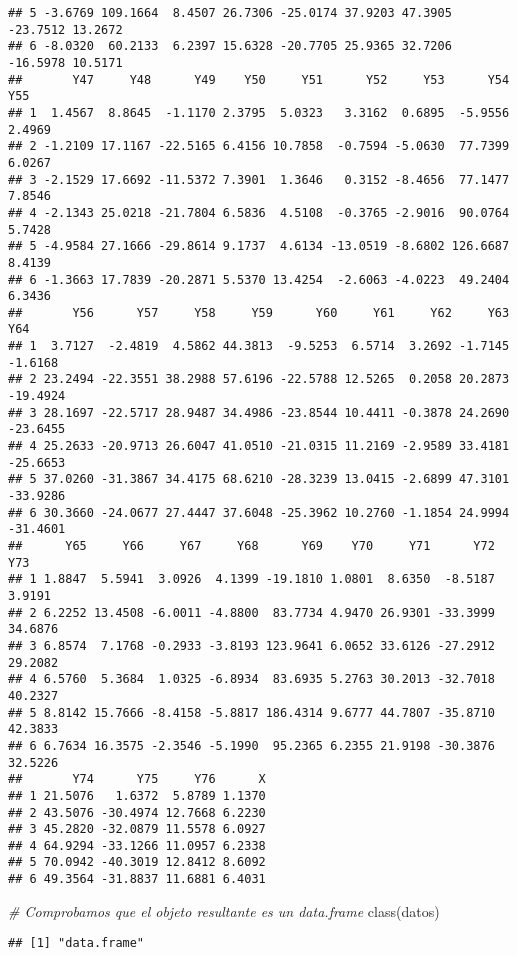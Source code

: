 \documentclass[
]{article}
\newenvironment{Shaded}{\begin{snugshade}}{\end{snugshade}}
\newcommand{\CommentTok}[1]{\textcolor[rgb]{0.56,0.35,0.01}{\textit{#1}}}
\newcommand{\FunctionTok}[1]{\textcolor[rgb]{0.00,0.00,0.00}{#1}}
\newcommand{\NormalTok}[1]{#1}
\begin{document}
\begin{verbatim}
## 5 -3.6769 109.1664  8.4507 26.7306 -25.0174 37.9203 47.3905 -23.7512 13.2672
## 6 -8.0320  60.2133  6.2397 15.6328 -20.7705 25.9365 32.7206 -16.5978 10.5171
##       Y47     Y48      Y49    Y50     Y51      Y52     Y53      Y54    Y55
## 1  1.4567  8.8645  -1.1170 2.3795  5.0323   3.3162  0.6895  -5.9556 2.4969
## 2 -1.2109 17.1167 -22.5165 6.4156 10.7858  -0.7594 -5.0630  77.7399 6.0267
## 3 -2.1529 17.6692 -11.5372 7.3901  1.3646   0.3152 -8.4656  77.1477 7.8546
## 4 -2.1343 25.0218 -21.7804 6.5836  4.5108  -0.3765 -2.9016  90.0764 5.7428
## 5 -4.9584 27.1666 -29.8614 9.1737  4.6134 -13.0519 -8.6802 126.6687 8.4139
## 6 -1.3663 17.7839 -20.2871 5.5370 13.4254  -2.6063 -4.0223  49.2404 6.3436
##       Y56      Y57     Y58     Y59      Y60     Y61     Y62     Y63      Y64
## 1  3.7127  -2.4819  4.5862 44.3813  -9.5253  6.5714  3.2692 -1.7145  -1.6168
## 2 23.2494 -22.3551 38.2988 57.6196 -22.5788 12.5265  0.2058 20.2873 -19.4924
## 3 28.1697 -22.5717 28.9487 34.4986 -23.8544 10.4411 -0.3878 24.2690 -23.6455
## 4 25.2633 -20.9713 26.6047 41.0510 -21.0315 11.2169 -2.9589 33.4181 -25.6653
## 5 37.0260 -31.3867 34.4175 68.6210 -28.3239 13.0415 -2.6899 47.3101 -33.9286
## 6 30.3660 -24.0677 27.4447 37.6048 -25.3962 10.2760 -1.1854 24.9994 -31.4601
##      Y65     Y66     Y67     Y68      Y69    Y70     Y71      Y72     Y73
## 1 1.8847  5.5941  3.0926  4.1399 -19.1810 1.0801  8.6350  -8.5187  3.9191
## 2 6.2252 13.4508 -6.0011 -4.8800  83.7734 4.9470 26.9301 -33.3999 34.6876
## 3 6.8574  7.1768 -0.2933 -3.8193 123.9641 6.0652 33.6126 -27.2912 29.2082
## 4 6.5760  5.3684  1.0325 -6.8934  83.6935 5.2763 30.2013 -32.7018 40.2327
## 5 8.8142 15.7666 -8.4158 -5.8817 186.4314 9.6777 44.7807 -35.8710 42.3833
## 6 6.7634 16.3575 -2.3546 -5.1990  95.2365 6.2355 21.9198 -30.3876 32.5226
##       Y74      Y75     Y76      X
## 1 21.5076   1.6372  5.8789 1.1370
## 2 43.5076 -30.4974 12.7668 6.2230
## 3 45.2820 -32.0879 11.5578 6.0927
## 4 64.9294 -33.1266 11.0957 6.2338
## 5 70.0942 -40.3019 12.8412 8.6092
## 6 49.3564 -31.8837 11.6881 6.4031
\end{verbatim}

\begin{Shaded}
\begin{Highlighting}[]
\CommentTok{\# Comprobamos que el objeto resultante es un data.frame}
\FunctionTok{class}\NormalTok{(datos)}
\end{Highlighting}
\end{Shaded}

\begin{verbatim}
## [1] "data.frame"
\end{verbatim}
\end{document}
